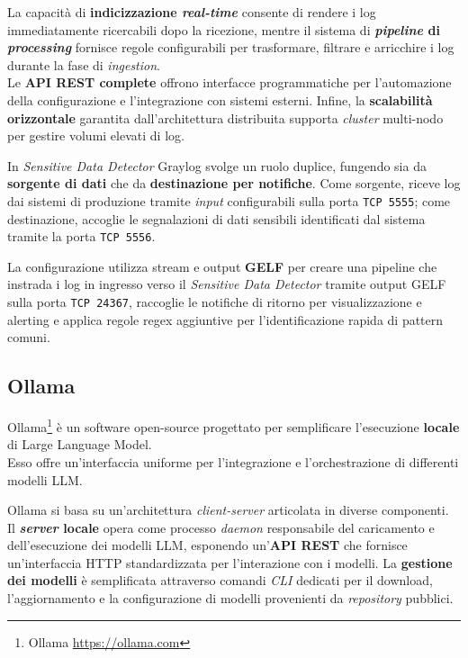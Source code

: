\documentclass[12pt,twoside]{report}
\begin{document}


La capacità di \textbf{indicizzazione \textit{real-time}} consente di rendere i log immediatamente ricercabili dopo la ricezione, mentre il sistema di \textbf{\textit{pipeline} di \textit{processing}} fornisce regole configurabili per trasformare, filtrare e arricchire i log durante la fase di \textit{ingestion}.\\
Le \textbf{API REST complete} offrono interfacce programmatiche per l'automazione della configurazione e l'integrazione con sistemi esterni. Infine, la \textbf{scalabilità orizzontale} garantita dall'architettura distribuita supporta \textit{cluster} multi-nodo per gestire volumi elevati di log.

In \textit{Sensitive Data Detector} Graylog svolge un ruolo duplice, fungendo sia da \textbf{sorgente di dati} che da \textbf{destinazione per notifiche}. Come sorgente, riceve log dai sistemi di produzione tramite \textit{input} configurabili sulla porta \texttt{TCP 5555}; come destinazione, accoglie le segnalazioni di dati sensibili identificati dal sistema tramite la porta \texttt{TCP 5556}.

La configurazione utilizza stream e output \textbf{GELF} per creare una pipeline che instrada i log in ingresso verso il \textit{Sensitive Data Detector} tramite output GELF sulla porta \texttt{TCP 24367}, raccoglie le notifiche di ritorno per visualizzazione e alerting e applica regole regex aggiuntive per l'identificazione rapida di pattern comuni.

\subsection{Ollama}
\label{subsec:ollama}

Ollama\footnote{Ollama \url{https://ollama.com}} è un software open-source progettato per semplificare l'esecuzione \textbf{locale} di Large Language Model.\\
Esso offre un'interfaccia uniforme per l'integrazione e l'orchestrazione di differenti modelli LLM.

Ollama si basa su un'architettura \textit{client-server} articolata in diverse componenti. Il \textbf{\textit{server} locale} opera come processo \textit{daemon} responsabile del caricamento e dell'esecuzione dei modelli LLM, esponendo un'\textbf{API REST} che fornisce un'interfaccia HTTP standardizzata per l'interazione con i modelli. La \textbf{gestione dei modelli} è semplificata attraverso comandi \textit{CLI} dedicati per il download, l'aggiornamento e la configurazione di modelli provenienti da \textit{repository} pubblici.
\end{document}
